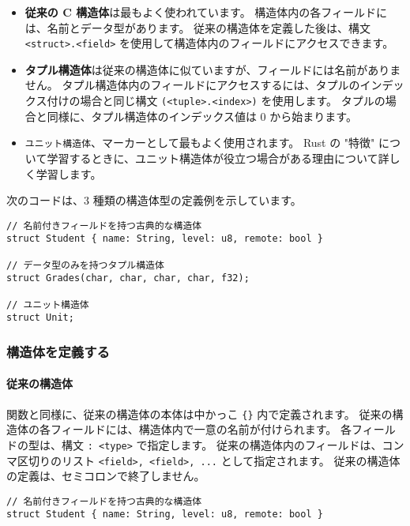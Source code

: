 \begin{itemize}
\item \textbf{従来の C 構造体}は最もよく使われています。 構造体内の各フィールドには、名前とデータ型があります。 従来の構造体を定義した後は、構文 \texttt{<struct>.<field>} を使用して構造体内のフィールドにアクセスできます。
\item \textbf{タプル構造体}は従来の構造体に似ていますが、フィールドには名前がありません。 タプル構造体内のフィールドにアクセスするには、タプルのインデックス付けの場合と同じ構文 \texttt{(<tuple>.<index>)} を使用します。 タプルの場合と同様に、タプル構造体のインデックス値は 0 から始まります。
\item \texttt{ユニット構造体}、マーカーとして最もよく使用されます。 Rust の "特徴" について学習するときに、ユニット構造体が役立つ場合がある理由について詳しく学習します。
\end{itemize}

次のコードは、3 種類の構造体型の定義例を示しています。

\begin{lstlisting}[numbers=none]
// 名前付きフィールドを持つ古典的な構造体
struct Student { name: String, level: u8, remote: bool }

// データ型のみを持つタプル構造体
struct Grades(char, char, char, char, f32);

// ユニット構造体
struct Unit;
\end{lstlisting}

\subsubsection{構造体を定義する}

\paragraph{従来の構造体}

関数と同様に、従来の構造体の本体は中かっこ \texttt{\{\}} 内で定義されます。 従来の構造体の各フィールドには、構造体内で一意の名前が付けられます。 各フィールドの型は、構文 \texttt{: <type>} で指定します。 従来の構造体内のフィールドは、コンマ区切りのリスト \texttt{<field>, <field>, ...} として指定されます。 従来の構造体の定義は、セミコロンで終了しません。


\begin{lstlisting}[numbers=none]
// 名前付きフィールドを持つ古典的な構造体
struct Student { name: String, level: u8, remote: bool }
\end{lstlisting}

